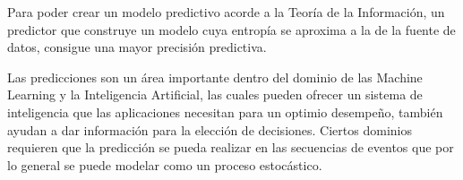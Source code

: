 Para poder crear un modelo predictivo acorde a la Teoría de la Información, un predictor que construye un modelo cuya entropía se aproxima a la de la fuente de datos, consigue una mayor precisión predictiva.

















Las predicciones son un área importante dentro del dominio de las Machine Learning y la Inteligencia Artificial, las cuales pueden ofrecer un sistema de inteligencia que las aplicaciones necesitan para un optimio desempeño, también ayudan a dar información para la elección de decisiones. Ciertos dominios requieren que la predicción se pueda realizar en las secuencias de eventos que por lo general se puede modelar como un proceso estocástico. 

